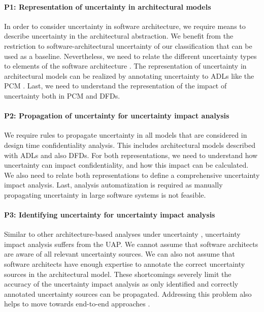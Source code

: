 \paragraph{P1: Representation of uncertainty in architectural models}\label{p:2:1}
In order to consider uncertainty in software architecture, we require means to describe uncertainty in the architectural abstraction.
We benefit from the restriction to software-architectural uncertainty of our classification \cite{hahner_architecture-based_2023} that can be used as a baseline.
Nevertheless, we need to relate the different uncertainty types to elements of the software architecture \cite{troya_uncertainty_2021}.
The representation of uncertainty in architectural models can be realized by annotating uncertainty to \acp{ADL} like the \ac{PCM} \cite{reussner_modeling_2016}.
Last, we need to understand the representation of the impact of uncertainty both in \ac{PCM} and \acp{DFD}.

\paragraph{P2: Propagation of uncertainty for uncertainty impact analysis}\label{p:2:2}
We require rules to propagate uncertainty in all models that are considered in design time confidentiality analysis.
This includes architectural models described with \acp{ADL} and also \acp{DFD}.
For both representations, we need to understand how uncertainty can impact confidentiality, and how this impact can be calculated.
We also need to relate both representations to define a comprehensive uncertainty impact analysis.
Last, analysis automatization is required as manually propagating uncertainty in large software systems is not feasible.

\paragraph{P3: Identifying uncertainty for uncertainty impact analysis}\label{p:2:3}
Similar to other architecture-based analyses under uncertainty \cite{hahner_model-based_2023,walter_architectural_2022}, uncertainty impact analysis suffers from the \acf{UAP}.
We cannot assume that software architects are aware of all relevant uncertainty sources.
We can also not assume that software architects have enough expertise to annotate the correct uncertainty sources in the architectural model.
These shortcomings severely limit the accuracy of the uncertainty impact analysis as only identified and correctly annotated uncertainty sources can be propagated.
Addressing this problem also helps to move towards end-to-end approaches \cite{weyns_towards_2023}.

